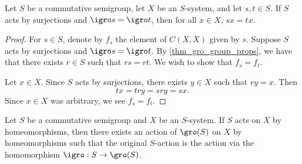 \begin{theorem}
\label{thm_igro_same_implies_elts_act_same}
\leanok{}
    Let $S$ be a commutative semigroup, let $X$ be an $S$-system, and let $s, t \in S$.  If $S$ acts by surjections and $\igro s = \igro t$, then for all $x \in X$, $sx = tx$.
\end{theorem}

\begin{proof}
\leanok{}
    For $s \in S$, denote by $f_s$ the element of $C(X,X)$ given by $s$.  Suppose $S$ acts by surjections and $\igro s = \igro t$. By \cref{thm_gro_group_props}, we have that there exists $r \in S$ such that $rs = rt$.  We wish to show that $f_s = f_t$.  

    Let $x \in X$. Since $S$ acts by surjections, there exists $y \in X$ such that $ry = x$.  Then
    \[tx = try = sry = sx.\]
    Since $x \in X$ was arbitrary, we see $f_s = f_t$.
\end{proof}

\begin{theorem}
\label{thm_extend_homeo_action_to_gr_group}
\leanok{}
    Let $S$ be a commutative semigroup and $X$ be an $S$-system.  If $S$ acts on $X$ by homeomorphisms, then there exists an action of $\gro(S)$ on $X$ by homeomorphisms such that the original $S$-action is the action via the homomorphism $\igro: S \to \gro(S)$.
\end{theorem}

